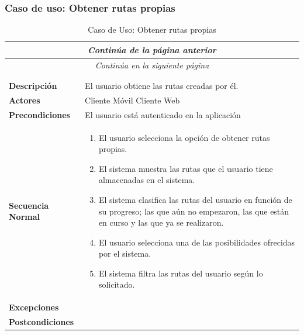 \subsubsection*{Caso de uso: Obtener rutas propias}
\begin{longtable}{| p{4cm} | p{10cm} |}
\endfirsthead
\multicolumn{2}{c}{\textit{Continúa de la página anterior}}\\[12pt]
\hline
\endhead
\hline
\multicolumn{2}{c}{\textit{Continúa en la siguiente página}} \\
\endfoot
\hline
\caption{Caso de Uso: Obtener rutas propias}\label{fig:1}\\
\endlastfoot


\hline
\multicolumn{2}{|c|}{\textbf{CU$<$05$>$ - Obtener Rutas Propias}} \\

\hline
\textbf{Descripción} &
El usuario obtiene las rutas creadas por él.\\

\hline
\textbf{Actores} &
Cliente Móvil\newline
Cliente Web\\

\hline
\textbf{Precondiciones} &
El usuario está autenticado en la aplicación\\

\hline
\textbf{Secuencia Normal} &\mbox{}\par\vspace{-\baselineskip}
\begin{enumerate}[leftmargin=0.7cm, topsep=0.1cm]
\item El usuario selecciona la opción de obtener rutas propias.
\item El sistema muestra las rutas que el usuario tiene almacenadas en el sistema.
\item El sistema clasifica las rutas del usuario en función de su progreso; las que aún no empezaron, las que están en curso y las que ya se realizaron.
\item El usuario selecciona una de las posibilidades ofrecidas por el sistema.
\item El sistema filtra las rutas del usuario según lo solicitado.
\end{enumerate}\\

\hline
\textbf{Excepciones} &\mbox{}\par\vspace{-\baselineskip}
\\

\hline
\textbf{Postcondiciones} & 
\\
\hline
\end{longtable}




